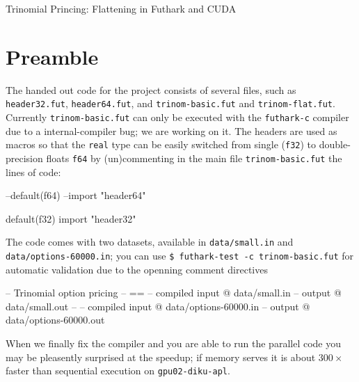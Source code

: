 \documentclass[a4paper,11pt]{article}
\newcommand{\fasto}{\textsc{Fasto}\xspace}
\begin{document}

\begin{center}

{\LARGE Trinomial Princing: Flattening in Futhark and CUDA}


\end{center}

\section*{Preamble}

The handed out code for the project consists of several files,
such as {\tt header32.fut}, {\tt header64.fut}, and 
{\tt trinom-basic.fut} and {\tt trinom-flat.fut}.
%
Currently {\tt trinom-basic.fut} can only be executed with 
the {\tt futhark-c} compiler due to a internal-compiler bug; 
we are working on it.  The headers are used as macros so
that the {\tt real} type can be easily switched from single ({\tt f32}) 
to double-precision floats {\tt f64} by (un)commenting in the main file 
{\tt trinom-basic.fut} the lines of code: 

\begin{fancycode}
--default(f64)
--import "header64"

default(f32)
import "header32"
\end{fancycode}

The code comes with two datasets, available in {\tt data/small.in}
and {\tt data/options-60000.in}; you can use 
{\tt \$ futhark-test -c trinom-basic.fut}
for automatic validation due to the openning comment directives

\begin{fancycode}
-- Trinomial option pricing
-- ==
-- compiled input @ data/small.in
-- output @ data/small.out
--
-- compiled input @ data/options-60000.in
-- output @ data/options-60000.out
\end{fancycode}

When we finally fix the compiler and you are able to run the parallel
code you may be pleasently surprised at the speedup; if memory serves
it is about $300\times$ faster than sequential execution on 
{\tt gpu02-diku-apl}.
\end{document}
